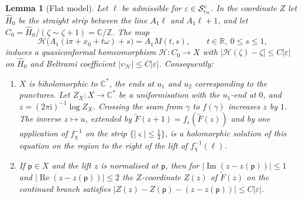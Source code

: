 \documentclass[11pt]{amsart}
\newtheorem{lemma}[theorem]{Lemma}
\theoremstyle{definition}
\newcommand{\ii}{\mathrm{i}}
\begin{document}
\begin{lemma}[Flat model]\label{lem:crescent-quotient}
Let $\ell$ be admissible for $\varepsilon\in\mathcal S^{\rm c}_{r_0}$.  In the coordinate $Z$ let
$\hat H_0$ be the straight strip between the line $A_1\ell$ and $A_1\ell+1$, and
let $C_0=\hat H_0/(\zeta\sim\zeta+1)=\mathbb C/\mathbb Z$.  The map
\[
 \mathcal H\bigl(A_1(\ii\pi+x_0+t\omega)+s\bigr)=A_1M(t,s),\qquad t\in\mathbb R,\ 0\le s\le1,
\]
induces a quasiconformal homeomorphism $\mathcal H:C_0\to X$ with
$|\mathcal H(\zeta)-\zeta|\le C|\varepsilon|$ on $\hat H_0$ and Beltrami coefficient
$|\upsilon_{\mathcal H}|\le C|\varepsilon|$.  Consequently:
\begin{enumerate}
\item $X$ is biholomorphic to $\mathbb C^*$, the ends at $u_1$ and $u_2$
  corresponding to the punctures.  Let $Z_X:X\to\mathbb C^*$ be a uniformisation
  with the $u_1$-end at $0$, and $z=(2\pi\ii)^{-1}\log Z_X$.  Crossing the seam
  from $\gamma$ to $f(\gamma)$ increases $z$ by $1$.  The inverse $z\mapsto u$, extended
  by $\tilde F(z+1)=f_\varepsilon(\tilde F(z))$ and by one application of $f_\chi^{-1}$
  on the strip $\{|\varsigma|\le\tfrac14\}$, is a holomorphic solution of this
  equation on the region to the right of the lift of $f_\chi^{-1}(\ell)$.
\item If $\mathsf p\in X$ and the lift $z$ is normalised at $\mathsf p$, then for
  $|\operatorname{Im}(z-z(\mathsf p))|\le1$ and $|\operatorname{Re}(z-z(\mathsf p))|\le2$ the
  $Z$-coordinate $Z(z)$ of $\tilde F(z)$ on the continued branch satisfies
  $|Z(z)-Z(\mathsf p)-(z-z(\mathsf p))|\le C|\varepsilon|$.
\end{enumerate}
\end{lemma}
\end{document}

